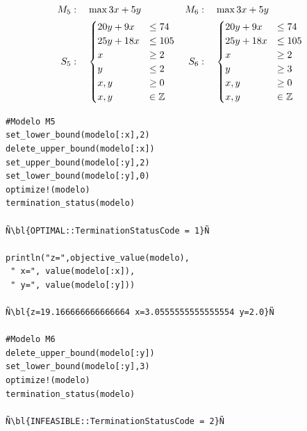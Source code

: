     \NAM{\begin{center}}{}
    \begin{minipage}{0.4\textwidth}
    	\begin{align*}
    	M_5&:\quad 	\max 3x+5y & M_6&:\quad 	\max 3x+5y\\ 
    	S_5&:\quad \begin{cases}
    	20y+9x&\leq 74\\
    	25y+18x&\leq 105\\
    	x&\geq 2\\
    	y&\leq 2\\
    	x,y&\geq 0\\
    	x,y&\in \mathbb Z\end{cases}&S_6&:\quad \begin{cases}
    	20y+9x&\leq 74\\
    	25y+18x&\leq 105\\
    	x&\geq 2\\
    	y&\geq 3\\
    	x,y&\geq 0\\
    	x,y&\in \mathbb Z\end{cases}
    	\end{align*}
    \end{minipage}
    \NAM{\end{center}}{}
    \begin{lstlisting}[escapechar=Ñ]
#Modelo M5
set_lower_bound(modelo[:x],2)
delete_upper_bound(modelo[:x])
set_upper_bound(modelo[:y],2) 
set_lower_bound(modelo[:y],0)
optimize!(modelo)
termination_status(modelo)

Ñ\bl{OPTIMAL::TerminationStatusCode = 1}Ñ

println("z=",objective_value(modelo),
 " x=", value(modelo[:x]),
 " y=", value(modelo[:y]))

Ñ\bl{z=19.166666666666664 x=3.0555555555555554 y=2.0}Ñ

#Modelo M6
delete_upper_bound(modelo[:y])
set_lower_bound(modelo[:y],3) 
optimize!(modelo)
termination_status(modelo)

Ñ\bl{INFEASIBLE::TerminationStatusCode = 2}Ñ
    \end{lstlisting}
    \NAM{
    \end{minipage}
    \end{center}
    }{
    \end{minipage}
    }
    
